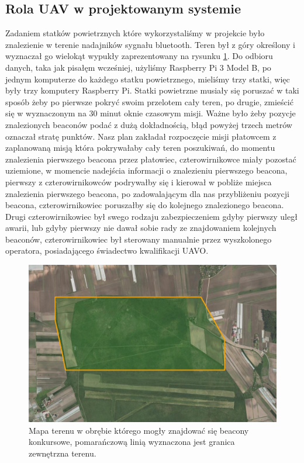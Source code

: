 \subsection{Rola UAV w projektowanym systemie}
Zadaniem statków powietrznych które wykorzystaliśmy w projekcie było znalezienie w terenie nadajników sygnału bluetooth. Teren był z góry określony i wyznaczał go wielokąt wypukły zaprezentowany na rysunku \ref{fig:teren}. Do odbioru danych, taka jak pisałęm wcześniej, użyliśmy Raspberry Pi 3 Model B, po jednym komputerze do każdego statku powietrznego, mieliśmy trzy statki, więc były trzy komputery Raspberry Pi. Statki powietrzne musiały się poruszać w taki sposób żeby po pierwsze pokryć swoim przelotem cały teren, po drugie, zmieścić się w wyznaczonym na 30 minut oknie czasowym misji. Ważne było żeby pozycje znalezionych beaconów podać z dużą dokładnością, błąd powyżej trzech metrów oznaczał stratę punktów. Nasz plan zakładał rozpoczęcie misji płatowcem z zaplanowaną misją która pokrywałaby cały teren poszukiwań, do momentu znalezienia pierwszego beacona przez płatowiec, czterowirnikowce miały pozostać uziemione, w momencie nadejścia informacji o znalezieniu pierwszego beacona, pierwszy z czterowirnikowców podrywałby się i kierował w pobliże miejsca znalezienia pierwszego beacona, po zadowalającym dla nas przybliżeniu pozycji beacona, czterowirnikowiec poruszałby się do kolejnego znalezionego beacona. Drugi czterowirnikowiec był swego rodzaju zabezpieczeniem gdyby pierwszy uległ awarii, lub gdyby pierwszy nie dawał sobie rady ze znajdowaniem kolejnych beaconów, czterowirnikowiec był sterowany manualnie przez wyszkolonego operatora, posiadającego świadectwo kwalifikacji UAVO. 

\begin{figure}[!th]
    \centering
    \includegraphics[width=15cm]{zalaczniki/obrazy/teren.png}
    \caption{Mapa terenu w obrębie którego mogły znajdować się beacony konkursowe, pomarańczową linią wyznaczona jest granica zewnętrzna terenu.}
    \label{fig:teren}
\end{figure}

